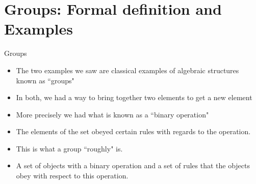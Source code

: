 \documentclass[ %
 10pt, xcolor={dvipsnames,svgnames,x11names,hyperref},
   hyperref={colorlinks=true,citecolor=green,linkcolor=DarkRed,urlcolor=ProcessBlue,anchorcolor=blue}
  ]{beamer}
\newenvironment{stepitemize}{\begin{itemize}[<+->]}{\end{itemize} }
\begin{document}
\section{Groups: Formal definition and Examples}
\begin{frame}{Groups}
    \begin{stepitemize}
    \item The two examples we saw are classical examples of algebraic structures known as ``groups"
    \item In both, we had a way to bring together two elements to get a new element
    \item More precisely we had what is known as a ``binary operation"
    \item The elements of the set obeyed certain rules with regards to the operation.
    \item This is what a group ``roughly" is.
    \item A set of objects with a binary operation and a set of rules that the objects obey with respect to this operation.
    \end{stepitemize}
\end{frame}
\end{document}
